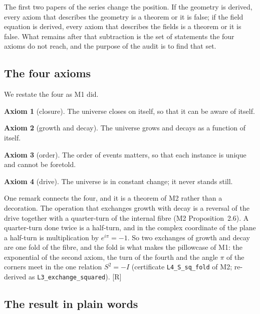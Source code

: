 \documentclass[11pt,a4paper]{article}
\theoremstyle{plain}
\theoremstyle{definition}
\newtheorem{axiom}{Axiom}
\theoremstyle{remark}
\newcommand{\rigR}{[\textup{R}]}
\begin{document}
The first two papers of the series change the position. If the geometry is derived, every axiom that describes the geometry is a theorem or it is false; if the field equation is derived, every axiom that describes the fields is a theorem or it is false. What remains after that subtraction is the set of statements the four axioms do not reach, and the purpose of the audit is to find that set.

\subsection{The four axioms}\label{sec:four}

We restate the four as M1 did.

\begin{axiom}[closure]\label{ax:A1}
The universe closes on itself, so that it can be aware of itself.
\end{axiom}

\begin{axiom}[growth and decay]\label{ax:A2}
The universe grows and decays as a function of itself.
\end{axiom}

\begin{axiom}[order]\label{ax:A3}
The order of events matters, so that each instance is unique and cannot be foretold.
\end{axiom}

\begin{axiom}[drive]\label{ax:A4}
The universe is in constant change; it never stands still.
\end{axiom}

One remark connects the four, and it is a theorem of M2 rather than a decoration. The operation that exchanges growth with decay is a reversal of the drive together with a quarter-turn of the internal fibre (M2 Proposition~2.6). A quarter-turn done twice is a half-turn, and in the complex coordinate of the plane a half-turn is multiplication by $e^{i\pi}=-1$. So two exchanges of growth and decay are one fold of the fibre, and the fold is what makes the pillowcase of M1: the exponential of the second axiom, the turn of the fourth and the angle $\pi$ of the corners meet in the one relation $S^{2}=-I$ (certificate \texttt{L4\_S\_sq\_fold} of M2; re-derived as \texttt{L3\_exchange\_squared}). \rigR

\subsection{The result in plain words}\label{sec:plain}
\end{document}
